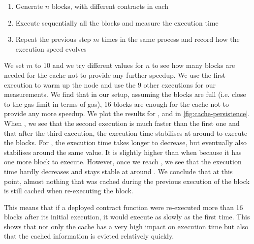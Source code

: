 \begin{enumerate}
  \item Generate $n$ blocks, with different contracts in each
  \item Execute sequentially all the blocks and measure the execution time
  \item Repeat the previous step $m$ times in the same process and record how the execution speed evolves
\end{enumerate}

We set $m$ to 10 and we try different values for $n$ to see how many blocks are needed for the cache not to provide any further speedup.
We use the first execution to warm up the node and use the $9$ other executions for our measurements.
We find that in our setup, assuming the blocks are full (i.e. close to the gas limit in terms of gas), $16$ blocks are enough for the cache not to provide any more speedup.
We plot the results for ,  and  in \autoref{fig:cache-persistence}.
When , we see that the second execution is much faster than the first one and that after the third execution, the execution time stabilises at around  to execute the  blocks. For , the execution time takes longer to decrease, but eventually also stabilises around the same value. It is slightly higher than when  because it has one more block to execute.
However, once we reach , we see that the execution time hardly decreases and stays stable at around . We conclude that at this point, almost nothing that was cached during the previous execution of the block is still cached when re-executing the block.

This means that if a deployed contract function were re-executed more than 16 blocks after its initial execution, it would execute as slowly as the first time.
This shows that not only the cache has a very high impact on execution time but also that the cached information is evicted relatively quickly.

